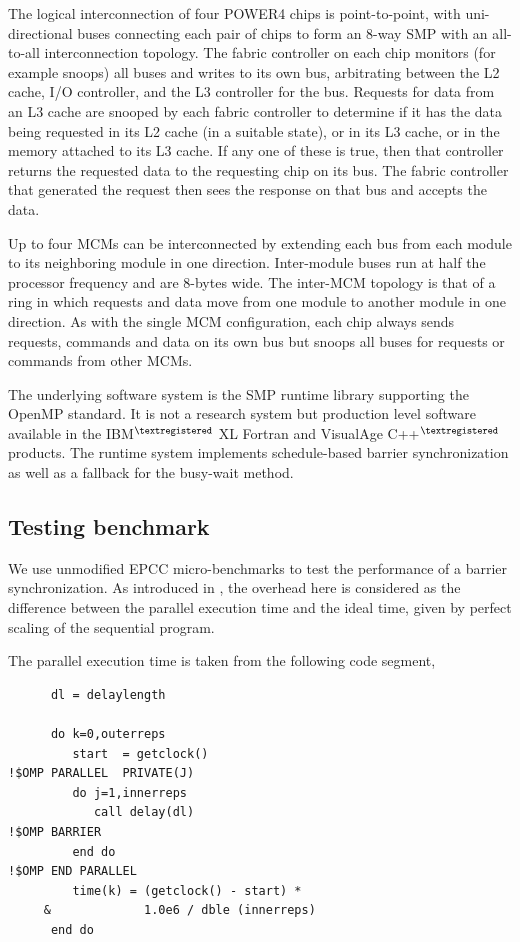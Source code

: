 The logical interconnection of four POWER4 chips is point-to-point,
with uni-directional buses connecting each pair of chips to form an
8-way SMP with an all-to-all interconnection topology. The fabric
controller on each chip monitors (for example snoops) all buses and
writes to its own bus, arbitrating between the L2 cache, I/O
controller, and the L3 controller for the bus. Requests for data from
an L3 cache are snooped by each fabric controller to determine if it
has the data being requested in its L2 cache (in a suitable state), or
in its L3 cache, or in the memory attached to its L3 cache. If any one
of these is true, then that controller returns the requested data to
the requesting chip on its bus. The fabric controller that generated
the request then sees the response on that bus and accepts the data.

Up to four MCMs can be interconnected by extending each bus from
each module to its neighboring module in one direction. Inter-module
buses run at half the processor frequency and are 8-bytes wide. The
inter-MCM topology is that of a ring in which requests and data move
from one module to another module in one direction. As with the single
MCM configuration, each chip always sends requests, commands and data
on its own bus but snoops all buses for requests or commands from
other MCMs.

The underlying software system is the SMP runtime library supporting
the OpenMP standard. It is not a research system but production
level software available in the IBM$^{\textregistered}$ 
XL Fortran and VisualAge C++$^{\textregistered}$ products.
The runtime system implements schedule-based barrier synchronization
as well as a fallback for the busy-wait method.

\subsection{Testing benchmark}

We use unmodified EPCC micro-benchmarks to test the performance of a
barrier synchronization. As introduced in \cite{Bul99}, the overhead
here is considered as the difference between the parallel execution
time and the ideal time, given by perfect scaling of the sequential
program.

The parallel execution time is taken from the following code segment, 

{\small
\begin{verbatim}
      dl = delaylength

      do k=0,outerreps
         start  = getclock()
!$OMP PARALLEL  PRIVATE(J)                   
         do j=1,innerreps
            call delay(dl)
!$OMP BARRIER                                
         end do
!$OMP END PARALLEL
         time(k) = (getclock() - start) *
     &             1.0e6 / dble (innerreps)
      end do
\end{verbatim}
}

